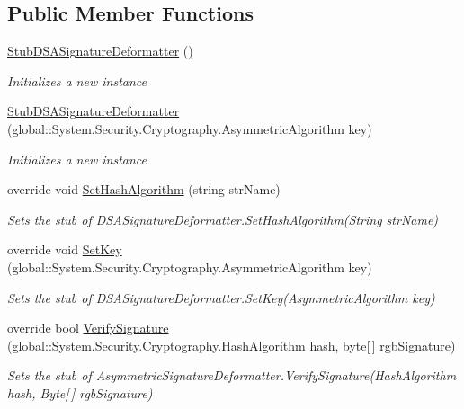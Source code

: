 \subsection*{Public Member Functions}
\begin{DoxyCompactItemize}
\item 
\hyperlink{class_system_1_1_security_1_1_cryptography_1_1_fakes_1_1_stub_d_s_a_signature_deformatter_a7c43cc798308c58b9c4c661b9a0e0037}{Stub\-D\-S\-A\-Signature\-Deformatter} ()
\begin{DoxyCompactList}\small\item\em Initializes a new instance\end{DoxyCompactList}\item 
\hyperlink{class_system_1_1_security_1_1_cryptography_1_1_fakes_1_1_stub_d_s_a_signature_deformatter_a23a328dabf70eda67316f9893c61b154}{Stub\-D\-S\-A\-Signature\-Deformatter} (global\-::\-System.\-Security.\-Cryptography.\-Asymmetric\-Algorithm key)
\begin{DoxyCompactList}\small\item\em Initializes a new instance\end{DoxyCompactList}\item 
override void \hyperlink{class_system_1_1_security_1_1_cryptography_1_1_fakes_1_1_stub_d_s_a_signature_deformatter_a23e7276573d2ad5cb4e5982a1617fee3}{Set\-Hash\-Algorithm} (string str\-Name)
\begin{DoxyCompactList}\small\item\em Sets the stub of D\-S\-A\-Signature\-Deformatter.\-Set\-Hash\-Algorithm(\-String str\-Name)\end{DoxyCompactList}\item 
override void \hyperlink{class_system_1_1_security_1_1_cryptography_1_1_fakes_1_1_stub_d_s_a_signature_deformatter_acf4b3345c18f623a6b2fe2c0ef743c9d}{Set\-Key} (global\-::\-System.\-Security.\-Cryptography.\-Asymmetric\-Algorithm key)
\begin{DoxyCompactList}\small\item\em Sets the stub of D\-S\-A\-Signature\-Deformatter.\-Set\-Key(\-Asymmetric\-Algorithm key)\end{DoxyCompactList}\item 
override bool \hyperlink{class_system_1_1_security_1_1_cryptography_1_1_fakes_1_1_stub_d_s_a_signature_deformatter_aea13748a4c41719031165ba8f82288f5}{Verify\-Signature} (global\-::\-System.\-Security.\-Cryptography.\-Hash\-Algorithm hash, byte\mbox{[}$\,$\mbox{]} rgb\-Signature)
\begin{DoxyCompactList}\small\item\em Sets the stub of Asymmetric\-Signature\-Deformatter.\-Verify\-Signature(\-Hash\-Algorithm hash, Byte\mbox{[}$\,$\mbox{]} rgb\-Signature)\end{DoxyCompactList}\item 

\end{DoxyCompactItemize}
